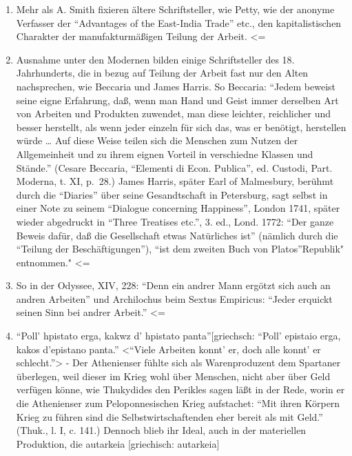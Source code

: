 {\begin{enumerate}
  oder geringre Anwendung der Teilung der Arbeit hängt von der Länge der
  Börse ab, nicht von der Größe des Genies. \textless{}=
\item
  Mehr als A. Smith fixieren ältere Schriftsteller, wie Petty, wie der
  anonyme Verfasser der ``Advantages of the East-India Trade'' etc., den
  kapitalistischen Charakter der manufakturmäßigen Teilung der Arbeit.
  \textless{}=
\item
  Ausnahme unter den Modernen bilden einige Schriftsteller des 18.
  Jahrhunderts, die in bezug auf Teilung der Arbeit fast nur den Alten
  nachsprechen, wie Beccaria und James Harris. So Beccaria: ``Jedem
  beweist seine eigne Erfahrung, daß, wenn man Hand und Geist immer
  derselben Art von Arbeiten und Produkten zuwendet, man diese leichter,
  reichlicher und besser herstellt, als wenn jeder einzeln für sich das,
  was er benötigt, herstellen würde \ldots{} Auf diese Weise teilen sich
  die Menschen zum Nutzen der Allgemeinheit und zu ihrem eignen Vorteil
  in verschiedne Klassen und Stände.'' (Cesare Beccaria, ``Elementi di
  Econ. Publica'', ed. Custodi, Part. Moderna, t. XI, p.~28.) James
  Harris, später Earl of Malmesbury, berühmt durch die ``Diaries'' über
  seine Gesandtschaft in Petersburg, sagt selbst in einer Note zu seinem
  ``Dialogue concerning Happiness'', London 1741, später wieder
  abgedruckt in ``Three Treatises etc.'', 3. ed., Lond. 1772: ``Der
  ganze Beweis dafür, daß die Gesellschaft etwas Natürliches ist''
  (nämlich durch die ``Teilung der Beschäftigungen''), ``ist dem zweiten
  Buch von Platos''Republik" entnommen." \textless{}=
\item
  So in der Odyssee, XIV, 228: ``Denn ein andrer Mann ergötzt sich auch
  an andren Arbeiten'' und Archilochus beim Sextus Empiricus: ``Jeder
  erquickt seinen Sinn bei andrer Arbeit.'' \textless{}=
\item
  ``Poll' hpistato erga, kakwz d' hpistato panta''{[}griechsch: ``Poll'
  epistaio erga, kakos d'epistano panta.'' \textless{}``Viele Arbeiten
  konnt' er, doch alle konnt' er schlecht.''\textgreater{} - Der
  Athenienser fühlte sich als Warenproduzent dem Spartaner überlegen,
  weil dieser im Krieg wohl über Menschen, nicht aber über Geld verfügen
  könne, wie Thukydides den Perikles sagen läßt in der Rede, worin er
  die Athenienser zum Peloponnesischen Krieg aufstachet: ``Mit ihren
  Körpern Krieg zu führen sind die Selbstwirtschaftenden eher bereit als
  mit Geld.'' (Thuk., l. I, c. 141.) Dennoch blieb ihr Ideal, auch in
  der materiellen Produktion, die autarkeia {[}griechisch: autarkeia{]}

\end{enumerate}}
